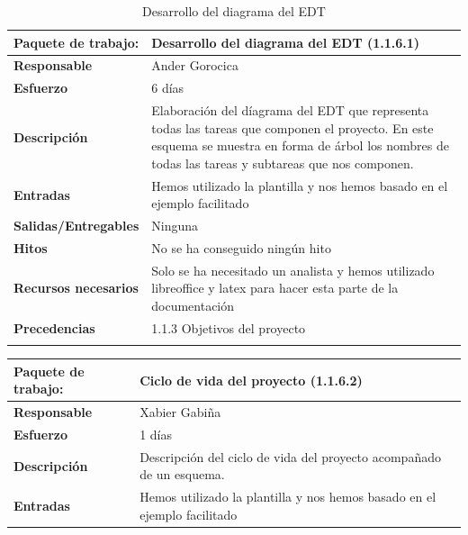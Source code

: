 \documentclass{report}
\begin{document}
\begin{center}
\begin{longtable}{|p{6cm}|p{6cm}|}
                \end{longtable}
                \begin{longtable}{|p{6cm}|p{6cm}|}
                    \hline
                    \textbf{Paquete de trabajo:} & Desarrollo del diagrama del EDT (1.1.6.1)\\
                    \hline
                    \textbf{Responsable} & Ander Gorocica\\
                    \hline
                    \textbf{Esfuerzo} & 6 días\\
                    \hline
                    \textbf{Descripción} & Elaboración del díagrama del EDT que representa todas las tareas que componen el proyecto. En este esquema se muestra en forma de árbol los nombres de todas las tareas y subtareas que nos componen.\\
                    \hline
                    \textbf{Entradas} & Hemos utilizado la plantilla y nos hemos basado en el ejemplo facilitado\\
                    \hline
                    \textbf{Salidas/Entregables} & Ninguna\\
                    \hline
                    \textbf{Hitos} & No se ha conseguido ningún hito\\
                    \hline
                    \textbf{Recursos necesarios} & Solo se ha necesitado un analista y hemos utilizado libreoffice y latex para hacer esta parte de la documentación\\
                    \hline
                    \textbf{Precedencias} & 1.1.3 Objetivos del proyecto\\
                    \hline
                    \caption{Desarrollo del diagrama del EDT}
                \end{longtable}
                \clearpage
                \begin{longtable}{|p{6cm}|p{6cm}|}
                    \hline
                    \textbf{Paquete de trabajo:} & Ciclo de vida del proyecto (1.1.6.2)\\
                    \hline
                    \textbf{Responsable} & Xabier Gabiña\\
                    \hline
                    \textbf{Esfuerzo} & 1 días\\
                    \hline
                    \textbf{Descripción} & Descripción del ciclo de vida del proyecto acompañado de un esquema.\\
                    \hline
                    \textbf{Entradas} & Hemos utilizado la plantilla y nos hemos basado en el ejemplo facilitado\\

\end{longtable}
\end{center}
\end{document}
